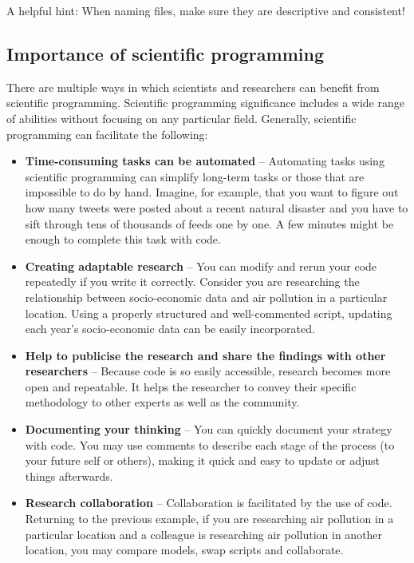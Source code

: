 \documentclass[
]{book}
\providecommand{\tightlist}{%
  \setlength{\itemsep}{0pt}\setlength{\parskip}{0pt}}
\begin{document}
A helpful hint: When naming files, make sure they are descriptive and consistent!

\hypertarget{importance-of-scientific-programming}{%
\subsection*{Importance of scientific programming}\label{importance-of-scientific-programming}}

There are multiple ways in which scientists and researchers can benefit from scientific programming. Scientific programming significance includes a wide range of abilities without focusing on any particular field. Generally, scientific programming can facilitate the following:

\begin{itemize}
\tightlist
\item
  \textbf{Time-consuming tasks can be automated} -- Automating tasks using scientific programming can simplify long-term tasks or those that are impossible to do by hand. Imagine, for example, that you want to figure out how many tweets were posted about a recent natural disaster and you have to sift through tens of thousands of feeds one by one. A few minutes might be enough to complete this task with code.
\item
  \textbf{Creating adaptable research} -- You can modify and rerun your code repeatedly if you write it correctly. Consider you are researching the relationship between socio-economic data and air pollution in a particular location. Using a properly structured and well-commented script, updating each year's socio-economic data can be easily incorporated.
\item
  \textbf{Help to publicise the research and share the findings with other researchers} -- Because code is so easily accessible, research becomes more open and repeatable. It helps the researcher to convey their specific methodology to other experts as well as the community.
\item
  \textbf{Documenting your thinking} -- You can quickly document your strategy with code. You may use comments to describe each stage of the process (to your future self or others), making it quick and easy to update or adjust things afterwards.
\item
  \textbf{Research collaboration} -- Collaboration is facilitated by the use of code. Returning to the previous example, if you are researching air pollution in a particular location and a colleague is researching air pollution in another location, you may compare models, swap scripts and collaborate.
\end{itemize}
\end{document}

